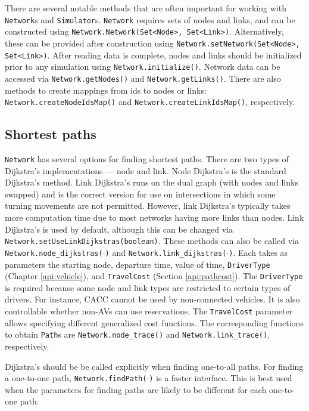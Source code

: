 There are several notable methods that are often important for working with \texttt{Network}s and \texttt{Simulator}s. \texttt{Network} requires sets of nodes and links, and can be constructed using \texttt{Network.Network(Set<Node>, Set<Link>)}. Alternatively, these can be provided after construction using \texttt{Network.setNetwork(Set<Node>, Set<Link>)}. After reading data is complete, nodes and links should be initialized prior to any simulation using \texttt{Network.initialize()}. Network data can be accessed via \texttt{Network.getNodes()} and  \texttt{Network.getLinks()}. There are also methods to create mappings from ids to nodes or links: \texttt{Network.createNodeIdsMap()} and \texttt{Network.createLinkIdsMap()}, respectively.

\subsection{Shortest paths}
\texttt{Network} has several options for finding shortest paths. There are two types of Dijkstra's implementations --- node and link. Node Dijkstra's is the standard Dijkstra's method. Link Dijkstra's runs on the dual graph (with nodes and links swapped) and is the correct version for use on intersections in which some turning movements are not permitted. However, link Dijkstra's typically takes more computation time due to most networks having more links than nodes. Link Dijkstra's is used by default, although this can be changed via \texttt{Network.setUseLinkDijkstras(boolean)}. These methods can also be called via \texttt{Network.node\_dijkstras($\cdot$)} and \texttt{Network.link\_dijkstras($\cdot$)}. Each takes as parameters the starting node, departure time, value of time, \texttt{DriverType} (Chapter \ref{api:vehicle}), and \texttt{TravelCost} (Section \ref{api:pathcost}). The \texttt{DriverType} is required because some node and link types are restricted to certain types of drivers. For instance, CACC cannot be used by non-connected vehicles. It is also controllable whether non-AVs can use reservations. The \texttt{TravelCost} parameter allows specifying different generalized cost functions. The corresponding functions to obtain \texttt{Path}s are \texttt{Network.node\_trace()} and \texttt{Network.link\_trace()}, respectively.

Dijkstra's should be be called explicitly when finding one-to-all paths. For finding a one-to-one path, \texttt{Network.findPath($\cdot$)} is a faster interface. This is best used when the parameters for finding paths are likely to be different for each one-to-one path.

